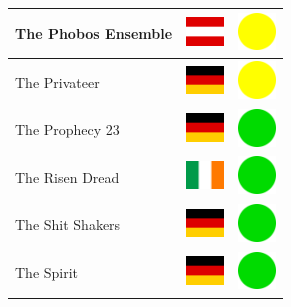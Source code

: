 \documentclass[12pt, a4paper, twoside]{report}
\begin{document}
\begin{center}
\begin{longtable}{|p{5cm}|p{2cm}|p{2cm}|}
 The Phobos Ensemble                                        & \includegraphics[width=1cm]{../4x3/at} &   \includegraphics[width=1cm]{../likes/m} \\ \hline
 The Privateer                                              & \includegraphics[width=1cm]{../4x3/de} &   \includegraphics[width=1cm]{../likes/m} \\ \hline
 The Prophecy 23                                            & \includegraphics[width=1cm]{../4x3/de} &   \includegraphics[width=1cm]{../likes/y} \\ \hline
 The Risen Dread                                            & \includegraphics[width=1cm]{../4x3/ie} &   \includegraphics[width=1cm]{../likes/y} \\ \hline
 The Shit Shakers                                           & \includegraphics[width=1cm]{../4x3/de} &   \includegraphics[width=1cm]{../likes/y} \\ \hline
 The Spirit                                                 & \includegraphics[width=1cm]{../4x3/de} &   \includegraphics[width=1cm]{../likes/y} \\ \hline

\end{longtable}
\end{center}
\end{document}
